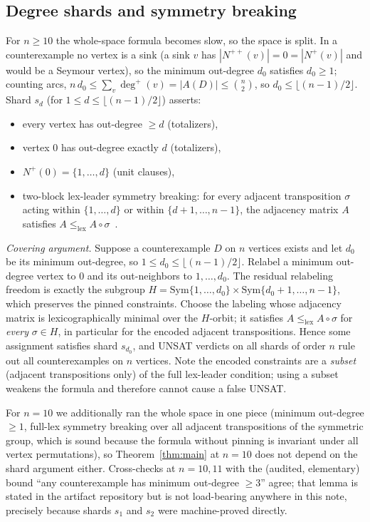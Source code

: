 \documentclass[11pt]{article}
\newcommand{\Nout}{N^{+}}
\newcommand{\Nsec}{N^{++}}
\begin{document}
\subsection{Degree shards and symmetry breaking}\label{sec:shards}

For $n \ge 10$ the whole-space formula becomes slow, so the space is split.
In a counterexample no vertex is a sink (a sink $v$ has
$|\Nsec(v)| = 0 = |\Nout(v)|$ and would be a Seymour vertex), so the
minimum out-degree $d_0$ satisfies $d_0 \ge 1$; counting arcs,
$n \, d_0 \le \sum_v \deg^+(v) = |A(D)| \le \binom{n}{2}$, so
$d_0 \le \lfloor (n-1)/2 \rfloor$. Shard $s_d$ (for
$1 \le d \le \lfloor (n-1)/2 \rfloor$) asserts:
\begin{itemize}
\item every vertex has out-degree $\ge d$ (totalizers),
\item vertex $0$ has out-degree exactly $d$ (totalizers),
\item $\Nout(0) = \{1, \dots, d\}$ (unit clauses),
\item two-block lex-leader symmetry breaking: for every adjacent
transposition $\sigma$ acting within $\{1,\dots,d\}$ or within
$\{d+1,\dots,n-1\}$, the adjacency matrix $A$ satisfies
$A \le_{\mathrm{lex}} A \circ \sigma$~\cite{Crawford96}.
\end{itemize}

\emph{Covering argument.} Suppose a counterexample $D$ on $n$ vertices
exists and let $d_0$ be its minimum out-degree, so
$1 \le d_0 \le \lfloor (n-1)/2 \rfloor$. Relabel a minimum out-degree
vertex to $0$ and its out-neighbors to $1, \dots, d_0$. The residual
relabeling freedom is exactly the subgroup
$H = \mathrm{Sym}\{1,\dots,d_0\} \times \mathrm{Sym}\{d_0+1,\dots,n-1\}$,
which preserves the pinned constraints. Choose the labeling whose adjacency
matrix is lexicographically minimal over the $H$-orbit; it satisfies
$A \le_{\mathrm{lex}} A \circ \sigma$ for \emph{every} $\sigma \in H$, in
particular for the encoded adjacent transpositions. Hence some assignment
satisfies shard $s_{d_0}$, and UNSAT verdicts on all shards of order $n$
rule out all counterexamples on $n$ vertices. Note the encoded constraints
are a \emph{subset} (adjacent transpositions only) of the full lex-leader
condition; using a subset weakens the formula and therefore cannot cause a
false UNSAT.

For $n = 10$ we additionally ran the whole space in one piece (minimum
out-degree $\ge 1$, full-lex symmetry breaking over all adjacent
transpositions of the symmetric group, which is sound because the formula
without pinning is invariant under all vertex permutations), so
Theorem~\ref{thm:main} at $n = 10$ does not depend on the shard argument
either. Cross-checks at $n = 10, 11$ with the (audited, elementary) bound
``any counterexample has minimum out-degree $\ge 3$'' agree; that lemma is
stated in the artifact repository but is not load-bearing anywhere in this
note, precisely because shards $s_1$ and $s_2$ were machine-proved
directly.
\end{document}
